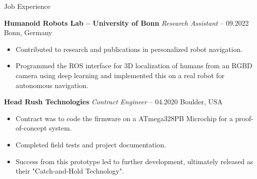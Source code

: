 \begin{rubric}{Job Experience}

%
%
\entry*[] \textbf{Humanoid Robots Lab -- University of Bonn} \hfill \textit{Research Assistant}  -- 09.2022 \hfill Bonn, Germany \newline 
\vspace{\CVItemizeHeaderSpacing} \begin{itemize} %
	\setlength{\itemsep}{\CVItemizeSpacing}
	
	
	\item Contributed to research and publications in personalized robot navigation.
	\item Programmed the ROS interface for 3D localization of humans from an RGBD camera using deep learning and implemented this on a real robot for autonomous navigation.
\end{itemize}

%
%
\entry*[] \textbf{Head Rush Technologies} \hfill \textit{Contract Engineer}  -- 04.2020 \hfill Boulder, USA \newline 
\vspace{\CVItemizeHeaderSpacing} \begin{itemize} %
	\setlength{\itemsep}{\CVItemizeSpacing}
	\item Contract was to code the firmware on a ATmega328PB Microchip for a proof-of-concept system.  
	\item Completed field tests and project documentation.  
	\item Success from this prototype led to further development, ultimately released as their "Catch-and-Hold Technology".
\end{itemize}



\end{rubric}
